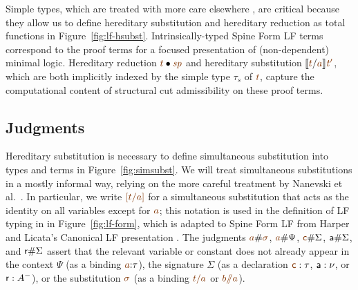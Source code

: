 Simple types, which are treated with more care elsewhere
\cite{harper07mechanizing,reed09hybrid}, are critical because they
allow us to define hereditary substitution and hereditary reduction as
total functions in Figure~\ref{fig:lf-hsubst}. Intrinsically-typed
Spine Form LF terms correspond to the proof terms for a focused
presentation of (non-dependent) minimal logic. Hereditary reduction
$\subst{\lf{t}}{\lf{\spi}}$ and hereditary substitution $\rsubst{\lf
  t}{\lf a}{\lf{t'}}$, which are both implicitly indexed by the simple
type $\tau_s$ of $\lf t$, capture the computational content of
structural cut admissibility on these proof terms.

\subsection{Judgments}

Hereditary substitution is necessary to define simultaneous
substitution into types and terms in Figure~\ref{fig:simsubst}.  We
will treat simultaneous substitutions in a mostly informal way,
relying on the more careful treatment by Nanevski et
al.~\cite{nanevski08contextual}. In particular, we write $\lf{[t/a]}$
for a simultaneous substitution that acts as the identity on all
variables except for $\lf{a}$; this notation is used in the definition
of LF typing in in Figure~\ref{fig:lf-form}, which is adapted to Spine
Form LF from Harper and Licata's Canonical LF presentation
\cite{harper07mechanizing}. The judgments $\lf{a}\#\lf{\sigma}$,
$\lf{a}\#\Psi$, $\lf{\sf c}\#\Sigma$, ${\sf a}\#\Sigma$, and ${\sf
  r}\#\Sigma$ assert that the relevant variable or constant does not
already appear in the context $\Psi$ (as a binding $\lf{a}{:}\tau$),
the signature $\Sigma$ (as a declaration $\lf{\sf c} : \tau$, ${\sf a}
: \nu$, or ${\sf r} : A^-$), or the substitution $\lf{\sigma}$ (as a
binding $\lf{t/a}$ or \mbox{$\lf{b/\!\!/a}$}).

